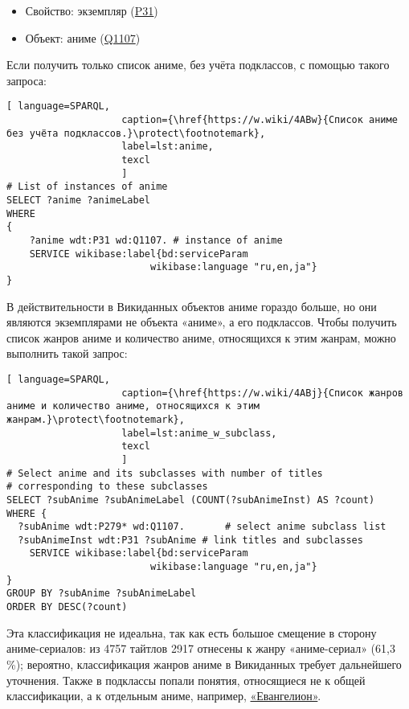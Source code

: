 \begin{itemize}
	\item Свойство: экземпляр (\href{https://www.wikidata.org/wiki/Property:P31}{P31})
	\item Объект: аниме (\href{https://www.wikidata.org/wiki/Q1107}{Q1107})
\end{itemize}

Если получить только список аниме, без учёта подклассов, с помощью такого запроса:

\begin{lstlisting}[ language=SPARQL, 
                    caption={\href{https://w.wiki/4ABw}{Список аниме без учёта подклассов.}\protect\footnotemark},
                    label=lst:anime,
                    texcl 
                    ]
# List of instances of anime
SELECT ?anime ?animeLabel
WHERE
{
    ?anime wdt:P31 wd:Q1107. # instance of anime
    SERVICE wikibase:label{bd:serviceParam
					     wikibase:language "ru,en,ja"}
}
\end{lstlisting}%

В действительности в Викиданных объектов аниме гораздо больше, но они являются экземплярами не объекта «аниме», а его подклассов. Чтобы получить список жанров аниме и количество аниме, относящихся к этим жанрам, можно выполнить такой запрос:

\begin{lstlisting}[ language=SPARQL, 
                    caption={\href{https://w.wiki/4ABj}{Список жанров аниме и количество аниме, относящихся к этим жанрам.}\protect\footnotemark},
                    label=lst:anime_w_subclass,
                    texcl 
                    ]
# Select anime and its subclasses with number of titles
# corresponding to these subclasses
SELECT ?subAnime ?subAnimeLabel (COUNT(?subAnimeInst) AS ?count)
WHERE {
  ?subAnime wdt:P279* wd:Q1107.       # select anime subclass list
  ?subAnimeInst wdt:P31 ?subAnime # link titles and subclasses
    SERVICE wikibase:label{bd:serviceParam
					     wikibase:language "ru,en,ja"}
}
GROUP BY ?subAnime ?subAnimeLabel
ORDER BY DESC(?count)
\end{lstlisting}%

Эта классификация не идеальна, так как есть большое смещение в сторону аниме-сериалов: из 4757 тайтлов 2917 отнесены к жанру «аниме-сериал» (61,3 \%); вероятно, классификация жанров аниме в Викиданных требует дальнейшего уточнения. Также в подклассы попали понятия, относящиеся не к общей классификации, а к отдельным аниме, например, \href{https://clck.ru/9cFfS}{«Евангелион»}.

